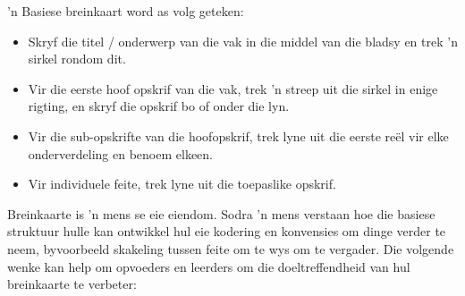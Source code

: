 'n Basiese breinkaart word as volg geteken:
\begin{itemize}[noitemsep]
\item
  Skryf die titel / onderwerp van die vak in die middel van die bladsy
  en trek 'n sirkel rondom dit.
\item
  Vir die eerste hoof opskrif van die vak, trek 'n streep uit die
  sirkel in enige rigting, en skryf die opskrif bo of onder die lyn.
\item
  Vir die sub-opskrifte van die hoofopskrif, trek lyne uit die eerste
  re\"{e}l vir elke onderverdeling en benoem elkeen.
\item
  Vir individuele feite, trek lyne uit die toepaslike opskrif.
\end{itemize}
Breinkaarte is 'n mens se eie eiendom. Sodra 'n mens verstaan ​​hoe die
basiese struktuur hulle kan ontwikkel hul eie kodering en konvensies
om dinge verder te neem, byvoorbeeld skakeling tussen feite om te wys
om te vergader. Die volgende wenke kan help om opvoeders en leerders
om die doeltreffendheid van hul breinkaarte te verbeter:

